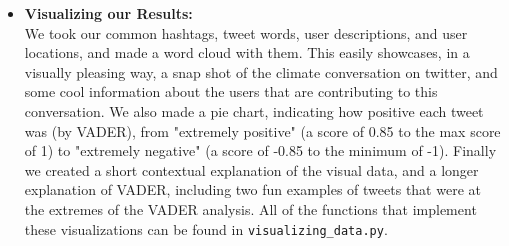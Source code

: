 \documentclass[fontsize=11pt]{article}
\begin{document}
\begin{itemize}
    \item \textbf{Visualizing our Results:} \\
    We took our common hashtags, tweet words, user descriptions, and user locations, and made a word cloud with them. This easily showcases, in a visually pleasing way, a snap shot of the climate conversation on twitter, and some cool information about the users that are contributing to this conversation. We also made a pie chart, indicating how positive each tweet was (by VADER), from "extremely positive" (a score of 0.85 to the max score of 1) to "extremely negative" (a score of -0.85 to the minimum of -1). Finally we created a short contextual explanation of the visual data, and a longer explanation of VADER, including two fun examples of tweets that were at the extremes of the VADER analysis. All of the functions that implement these visualizations can be found in \texttt{visualizing\_data.py}.
    

\end{itemize}
\end{document}
